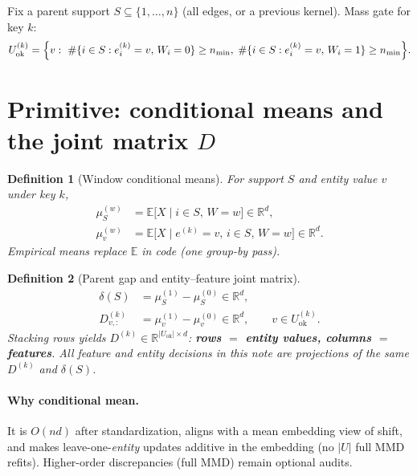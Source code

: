 \documentclass[11pt]{article}
\newtheorem{definition}{Definition}
\newcommand{\E}{\mathbb{E}}
\newcommand{\R}{\mathbb{R}}
\begin{document}
Fix a parent support \(S\subseteq\{1,\ldots,n\}\) (all edges, or a
previous kernel). Mass gate for key \(k\):
\begin{equation}
  U_{\mathrm{ok}}^{(k)}
  =\Bigl\{
    v:\ 
    \#\{i\in S: e_i^{(k)}=v,\,W_i=0\}\ge n_{\min},\;
    \#\{i\in S: e_i^{(k)}=v,\,W_i=1\}\ge n_{\min}
  \Bigr\}.
\end{equation}

\section{Primitive: conditional means and the joint matrix \(D\)}
\label{sec:cmean}

\begin{definition}[Window conditional means]
For support \(S\) and entity value \(v\) under key \(k\),
\begin{align}
  \mu_S^{(w)}
  &=\E\bigl[X \mid i\in S,\, W=w\bigr]
  \in\R^d, \\
  \mu_{v}^{(w)}
  &=\E\bigl[X \mid e^{(k)}=v,\, i\in S,\, W=w\bigr]
  \in\R^d.
\end{align}
Empirical means replace \(\E\) in code (one group-by pass).
\end{definition}

\begin{definition}[Parent gap and entity--feature joint matrix]
\begin{align}
  \delta(S)
  &=\mu_S^{(1)}-\mu_S^{(0)}
  \in\R^d,
  \label{eq:delta} \\
  D^{(k)}_{v,:}
  &=\mu_v^{(1)}-\mu_v^{(0)}
  \in\R^d,
  \qquad v\in U_{\mathrm{ok}}^{(k)}.
  \label{eq:D}
\end{align}
Stacking rows yields \(D^{(k)}\in\R^{|U_{\mathrm{ok}}|\times d}\):
\textbf{rows $=$ entity values, columns $=$ features}. All feature and
entity decisions in this note are projections of the same \(D^{(k)}\)
and \(\delta(S)\).
\end{definition}

\paragraph{Why conditional mean.}
It is \(O(nd)\) after standardization, aligns with a mean embedding
view of shift, and makes leave-one-\emph{entity} updates additive in
the embedding (no \(|U|\) full MMD refits). Higher-order discrepancies
(full MMD) remain optional audits.
\end{document}
